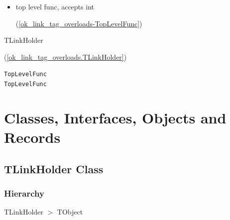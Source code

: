 \documentclass{report}
\begin{document}
\begin{description}
\begin{itemize}
\item \begin{ttfamily}top level func, accepts int\end{ttfamily}(\ref{ok_link_tag_overloads-TopLevelFunc})
\end{itemize}
\item[\texttt{\begin{ttfamily}TOverloadedBase\end{ttfamily} Class}]
\item[\texttt{\begin{ttfamily}TOverloadedMethods\end{ttfamily} Class}]\begin{ttfamily}TLinkHolder\end{ttfamily}(\ref{ok_link_tag_overloads.TLinkHolder})
\end{description}
\begin{description}
\item[\texttt{TopLevelFunc}]
\item[\texttt{TopLevelFunc}]
\end{description}
\section{Classes, Interfaces, Objects and Records}
\subsection*{TLinkHolder Class}
\subsubsection*{\large{\textbf{Hierarchy}}\normalsize\hspace{1ex}\hfill}
TLinkHolder {$>$} TObject
\end{document}
